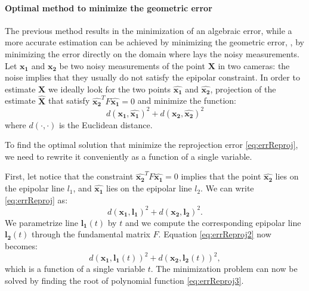 \paragraph{Optimal method to minimize the geometric error}
The previous method results in the minimization of an algebraic error, while a more accurate estimation can be achieved by minimizing the geometric error, \ie, by minimizing the error directly on the domain where lays the noisy measurements.
Let $\mathbf{x_1}$ and $\mathbf{x_2}$ be two noisy measurements of the point $\mathbf{X}$ in two cameras: the noise implies that they usually do not satisfy the epipolar constraint. In order to estimate $\mathbf{X}$ we ideally look for the two points $\hat{\mathbf{x_1}}$ and $\hat{\mathbf{x_2}}$, projection of the estimate $\hat{\mathbf{X}}$ that satisfy $\hat{\mathbf{x_2}}^{T} F \hat{\mathbf{x_1}} = 0$ and  minimize the function:
\begin{equation}
\label{eq:errReproj}
  d(\mathbf{x_1}, \hat{\mathbf{x_1}})^2 + d(\mathbf{x_2}, \hat{\mathbf{x_2}})^2
\end{equation}
where $d(\cdot,\cdot)$ is the Euclidean distance. 

To find the optimal solution that minimize the reprojection error \eqref{eq:errReproj}, we need to rewrite it conveniently as a function of a single variable.

First, let notice that the constraint $\hat{\mathbf{x_2}}^{T} F \hat{\mathbf{x_1}} = 0$ implies that the point $\hat{\mathbf{x_2}}$ lies on the epipolar line $l_1$, and $\hat{\mathbf{x_1}}$ lies on the epipolar line $l_2$. We can write \eqref{eq:errReproj} as:
\begin{equation}
\label{eq:errReproj2}
  d(\mathbf{x_1}, \mathbf{l_1})^2 + d(\mathbf{x_2}, \mathbf{l_2})^2.
\end{equation}
We parametrize line $\mathbf{l_1}(t)$ by $t$  and we compute the corresponding epipolar line $\mathbf{l_2}(t)$ through the fundamental matrix $F$. Equation \eqref{eq:errReproj2} now becomes:
\begin{equation}
\label{eq:errReproj3}
d(\mathbf{x_1}, \mathbf{l_1}(t))^2 + d(\mathbf{x_2}, \mathbf{l_2}(t))^2,
\end{equation}
which is a function of a single variable $t$. 
The minimization problem can now be solved by finding the root of polynomial function \eqref{eq:errReproj3}.

